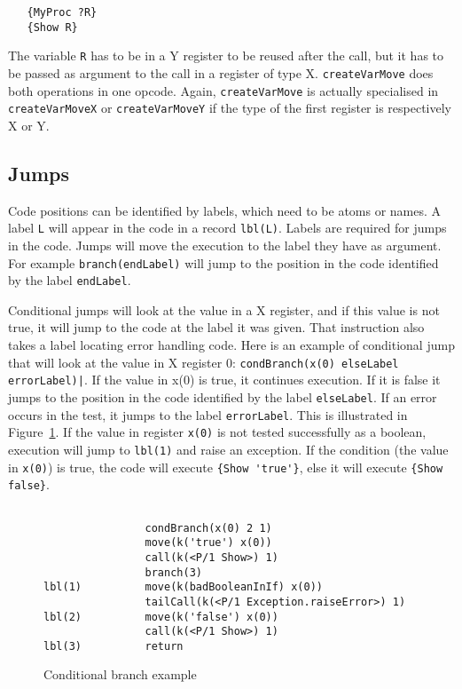 \documentclass[a4paper]{memoir}
\begin{document}
\begin{lstlisting}
   {MyProc ?R}
   {Show R}
\end{lstlisting}

The variable \lstinline!R! has to be in a Y register to be reused after the
call, but it has to be passed as argument to the call in a register of type X.
\lstinline!createVarMove! does both operations in one opcode.
Again, \lstinline!createVarMove! is actually specialised in
\lstinline!createVarMoveX! or \lstinline!createVarMoveY! if the type of the
first register is respectively X or Y.


\subsection{Jumps}\label{sec:opcode:jumps}
Code positions can be identified by labels, which need to be atoms or names. A label \lstinline!L! will appear in the code in a record \lstinline!lbl(L)!. 
Labels are required for jumps in the code. 
Jumps will move the execution to the label they have as argument. For example \lstinline!branch(endLabel)! will jump to the position in the code identified by the label \lstinline!endLabel!.

Conditional jumps will look at the value in a X register, and if this value is
not true, it will jump to the code at the label it was given. That instruction
also takes a label locating error handling code. Here is an example of
conditional jump that will look at the value in X register 0:
\lstinline!condBranch(x(0) elseLabel errorLabel)|!. If the value in x(0) is
true, it continues execution. If it is false it jumps to the position in the
code identified by the label \lstinline!elseLabel!. If an error occurs in the
test, it jumps to the label \lstinline!errorLabel!. This is illustrated in Figure~\ref{fig:target:condBranch}.
If the value in register \lstinline!x(0)! is not tested successfully as a
boolean, execution will jump to \lstinline!lbl(1)! and raise an exception. If
the condition (the value in \lstinline!x(0)!) is true, the code will execute
\lstinline!{Show 'true'}!, else it will execute \lstinline!{Show false}!.

\begin{figure}[ht]
\begin{lstlisting}

                condBranch(x(0) 2 1)
                move(k('true') x(0))
                call(k(<P/1 Show>) 1)
                branch(3)
lbl(1)          move(k(badBooleanInIf) x(0))
                tailCall(k(<P/1 Exception.raiseError>) 1)
lbl(2)          move(k('false') x(0))
                call(k(<P/1 Show>) 1)
lbl(3)          return

\end{lstlisting}
\caption{Conditional branch example}
\label{fig:target:condBranch}
\end{figure}
\end{document}
